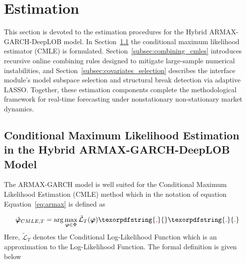 \documentclass[10pt,a4paper,oneside]{article}
\providecommand{\DIFaddtex}[1]{{\protect\color{blue} \sf #1}} %
\providecommand{\DIFdeltex}[1]{{\protect\color{red} \scriptsize #1}} %
\providecommand{\DIFaddbegin}{} %
\providecommand{\DIFaddend}{} %
\providecommand{\DIFdelbegin}{} %
\providecommand{\DIFdelend}{} %
\providecommand{\DIFadd}[1]{\texorpdfstring{\DIFaddtex{#1}}{#1}} %
\providecommand{\DIFdel}[1]{\texorpdfstring{\DIFdeltex{#1}}{}} %
\newcommand{\DIFscaledelfig}{0.5}
\newlength{\DIFdelgraphicswidth} %
\newlength{\DIFdelgraphicsheight} %
\newcommand{\DIFaddincludegraphics}[2][]{{\color{blue}\fbox{\DIFOincludegraphics[#1]{#2}}}} %
\newcommand{\DIFdelincludegraphics}[2][]{%
\sbox{\DIFdelgraphicsbox}{\DIFOincludegraphics[#1]{#2}}%
\settoboxwidth{\DIFdelgraphicswidth}{\DIFdelgraphicsbox} %
\settoboxtotalheight{\DIFdelgraphicsheight}{\DIFdelgraphicsbox} %
\scalebox{\DIFscaledelfig}{%
\parbox[b]{\DIFdelgraphicswidth}{\usebox{\DIFdelgraphicsbox}\\[-\baselineskip] \rule{\DIFdelgraphicswidth}{0em}}\llap{\resizebox{\DIFdelgraphicswidth}{\DIFdelgraphicsheight}{%
\setlength{\unitlength}{\DIFdelgraphicswidth}%
\begin{picture}(1,1)%
\thicklines\linethickness{2pt} %
{\color[rgb]{1,0,0}\put(0,0){\framebox(1,1){}}}%
{\color[rgb]{1,0,0}\put(0,0){\line( 1,1){1}}}%
{\color[rgb]{1,0,0}\put(0,1){\line(1,-1){1}}}%
\end{picture}%
}\hspace*{3pt}}} %
} %
\DeclareRobustCommand{\DIFaddbegin}{\DIFOaddbegin \let\includegraphics\DIFaddincludegraphics} %
\DeclareRobustCommand{\DIFaddend}{\DIFOaddend \let\includegraphics\DIFOincludegraphics} %
\DeclareRobustCommand{\DIFdelbegin}{\DIFOdelbegin \let\includegraphics\DIFdelincludegraphics} %
\DeclareRobustCommand{\DIFdelend}{\DIFOaddend \let\includegraphics\DIFOincludegraphics} %
\begin{document}
\section{Estimation}
\label{Sect:Estimation}
This section is devoted to the estimation procedures for the Hybrid ARMAX-GARCH-DeepLOB model.  In Section~\ref{subsec:cmle_props_paper} the conditional maximum likelihood estimator (CMLE) is formulated.  Section~\ref{subsec:combining_cmles} introduces recursive online combining rules designed to mitigate large-sample numerical instabilities, and Section~\ref{subsec:covariates_selection} describes the interface module’s model subspace selection and structural break detection via adaptive LASSO.  Together, these estimation components complete the methodological framework for real-time forecasting under \DIFdelbegin \DIFdel{nonstationary }\DIFdelend \DIFaddbegin \DIFadd{non-stationary }\DIFaddend market dynamics.


\subsection{Conditional Maximum Likelihood Estimation in the Hybrid ARMAX-GARCH-DeepLOB Model}
\label{subsec:cmle_props_paper}
The ARMAX-GARCH model is well suited for the Conditional Maximum Likelihood Estimation (CMLE) method which in the notation of \DIFdelbegin \DIFdel{equation}\DIFdelend \DIFaddbegin \DIFadd{Equation}\DIFaddend ~\eqref{eq:armax} is defined as

$$
    \hat{\boldsymbol{\varphi}}_{CMLE, T} = \arg\max_{\boldsymbol{\varphi} \in \Phi} {\tilde{\mathcal{L}}_{T}}(\boldsymbol{\varphi})\DIFdelbegin \DIFdel{,
}\DIFdelend \DIFaddbegin \DIFadd{.
}\DIFaddend $$
Here, $\tilde{\mathcal{L}}_{T}$ denotes the Conditional Log-Likelihood Function which is an approximation to the Log-Likelihood Function. The formal definition is given below
\end{document}
